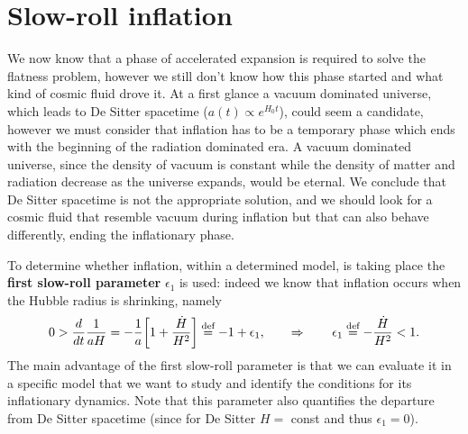 \section{Slow-roll inflation}
We now know that a phase of accelerated expansion is required to solve the flatness problem, however we still don't know how this phase started and what kind of cosmic fluid drove it. At a first glance a vacuum dominated universe, which leads to De Sitter spacetime ($a(t)\propto e^{H_0t}$), could seem a candidate, however we must consider that inflation has to be a temporary phase which ends with the beginning of the radiation dominated era. A vacuum dominated universe, since the density of vacuum is constant while the density of matter and radiation decrease as the universe expands, would be eternal. We conclude that De Sitter spacetime is not the appropriate solution, and we should look for a cosmic fluid that resemble vacuum during inflation but that can also behave differently, ending the inflationary phase.

To determine whether inflation, within a determined model, is taking place the \textbf{first slow-roll parameter} $\epsilon_1$ is used: indeed we know that inflation occurs when the Hubble radius is shrinking, namely
\begin{equation}
    \label{eq:First_SR_paramteter}
    0>\frac{d}{dt}\frac{1}{aH}=-\frac{1}{a}\bigg[1+\frac{\dot H}{H^2}\bigg]\stackrel{\text{def}}{=}-1+\epsilon_1,\qquad\Rightarrow\qquad\epsilon_1\stackrel{\text{def}}{=}-\frac{\dot H}{H^2}<1.
\end{equation}
The main advantage of the first slow-roll parameter is that we can evaluate it in a specific model that we want to study and identify the conditions for its inflationary dynamics. Note that this parameter also quantifies the departure from De Sitter spacetime (since for De Sitter $H=$ const and thus $\epsilon_1=0$).

